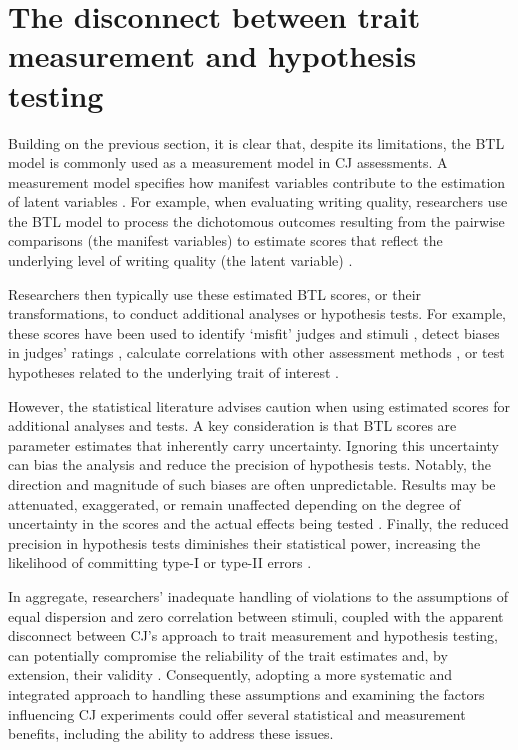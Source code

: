\documentclass[
  authoryear,
  review,
  1p]{elsarticle}
\begin{document}
\section{The disconnect between trait measurement and hypothesis
testing}\label{sec-theory-issue2}

Building on the previous section, it is clear that, despite its
limitations, the BTL model is commonly used as a measurement model in CJ
assessments. A measurement model specifies how manifest variables
contribute to the estimation of latent variables
\citep{Everitt_et_al_2010}. For example, when evaluating writing
quality, researchers use the BTL model to process the dichotomous
outcomes resulting from the pairwise comparisons (the manifest
variables) to estimate scores that reflect the underlying level of
writing quality (the latent variable)
\citep{Laming_2004, Pollitt_2012b, Whitehouse_2012, vanDaal_et_al_2016, Lesterhuis_2018_thesis, Coertjens_et_al_2017, Goossens_et_al_2018, Bouwer_et_al_2023}.

Researchers then typically use these estimated BTL scores, or their
transformations, to conduct additional analyses or hypothesis tests. For
example, these scores have been used to identify `misfit' judges and
stimuli \citep{Pollitt_2012b, vanDaal_et_al_2016, Goossens_et_al_2018},
detect biases in judges' ratings
\citep{Pollitt_et_al_2003, Pollitt_2012b}, calculate correlations with
other assessment methods \citep{Goossens_et_al_2018, Bouwer_et_al_2023},
or test hypotheses related to the underlying trait of interest
\citep{Bramley_et_al_2019, Boonen_et_al_2020, Bouwer_et_al_2023, vanDaal_et_al_2017, Jones_et_al_2019, Gijsen_et_al_2021}.

However, the statistical literature advises caution when using estimated
scores for additional analyses and tests. A key consideration is that
BTL scores are parameter estimates that inherently carry uncertainty.
Ignoring this uncertainty can bias the analysis and reduce the precision
of hypothesis tests. Notably, the direction and magnitude of such biases
are often unpredictable. Results may be attenuated, exaggerated, or
remain unaffected depending on the degree of uncertainty in the scores
and the actual effects being tested
\citetext{\citealp[pp.~25]{Kline_et_al_2023}; \citealp[pp.~137]{Hoyle_et_al_2023}}.
Finally, the reduced precision in hypothesis tests diminishes their
statistical power, increasing the likelihood of committing type-I or
type-II errors \citep{McElreath_2020}.

In aggregate, researchers' inadequate handling of violations to the
assumptions of equal dispersion and zero correlation between stimuli,
coupled with the apparent disconnect between CJ's approach to trait
measurement and hypothesis testing, can potentially compromise the
reliability of the trait estimates and, by extension, their validity
\citep[pp.~2]{Perron_et_al_2015}. Consequently, adopting a more
systematic and integrated approach to handling these assumptions and
examining the factors influencing CJ experiments could offer several
statistical and measurement benefits, including the ability to address
these issues.
\end{document}
